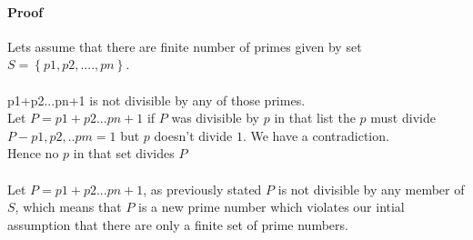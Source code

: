 \documentclass[12pt]{article}
\begin{document}
\maketitle

\paragraph{Proof}

Lets assume that there are finite number of primes given by set $S = \left\{  {p1, p2,....,pn}\right\} $.\\
\paragraph{}
p1+p2...pn+1 is not divisible by any of those primes. \\
Let $P = p1+p2...pn+1$ if $P$ was divisible by $p$ in that list the $p$ must divide $P - p1,p2,..pm=1$ but $p$ doesn't divide $1$. We have a contradiction.\\
Hence no $p$ in that set divides $P$ 
\paragraph{}
Let $P = p1+p2...pn+1$, as previously stated $P$ is  not divisible by any member of $S$, which means that $P$ is a new prime number which
violates our intial assumption that there are only a finite set of prime numbers.
\end{document}
